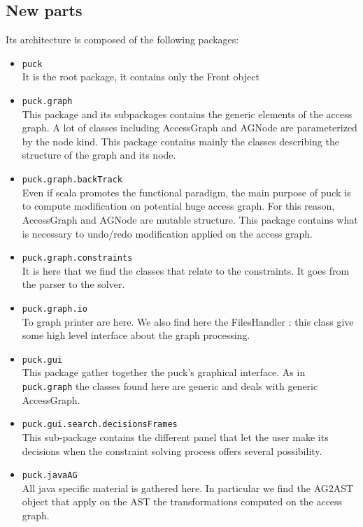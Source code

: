 \documentclass[]{article}
\begin{document}
\subsection{New parts}
Its architecture is composed of the following packages: 
\begin{itemize}
\item \verb|puck|\\
	It is the root package, it contains only the Front object

\item \verb|puck.graph|\\
	This package and its subpackages contains the generic elements of the access graph. A lot of classes including AccessGraph and AGNode are parameterized by the node kind. This package contains mainly the classes describing the structure of the graph and its node.

\item \verb|puck.graph.backTrack|\\
	Even if scala promotes the functional paradigm, the main purpose of puck is to compute modification on potential huge access graph. For this reason, AccessGraph and AGNode are mutable structure. This package contains what is necessary to undo/redo modification applied on the access graph.

\item \verb|puck.graph.constraints|\\
	It is here that we find the classes that relate to the constraints. It goes from the parser to the solver.

\item \verb|puck.graph.io|\\
	To graph printer are here. We also find here the FilesHandler : this class give some high level interface about the graph processing.

\item \verb|puck.gui|\\
	This package gather together the puck's graphical interface. As in \verb|puck.graph| the classes found here are generic and deals with generic AccessGraph.
	
\item \verb|puck.gui.search.decisionsFrames|\\
	This sub-package contains the different panel that let the user make its decisions when the constraint solving process offers several possibility.
	
\item \verb|puck.javaAG|\\
	All java specific material is gathered here. 
	In particular we find the AG2AST object that apply on the AST the transformations computed on the access graph.


\end{itemize}
\end{document}
